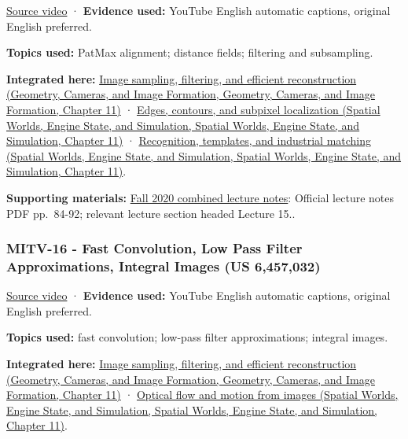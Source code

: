 \href{https://www.youtube.com/watch?v=R1yLwFOfwwc}{Source video} · \textbf{Evidence used:} YouTube English automatic captions, original English preferred.

\textbf{Topics used:} PatMax alignment; distance fields; filtering and subsampling.

\textbf{Integrated here:} \href{../03-Geometry-Cameras-and-Image-Formation/main.pdf\#nameddest=03-visual-computing-i-ch004-image-sampling-filtering-and-efficient-reconstruction}{Image sampling, filtering, and efficient reconstruction (Geometry, Cameras, and Image Formation, Geometry, Cameras, and Image Formation, Chapter 11)} · \href{../05-Spatial-Worlds-Engine-State-and-Simulation/main.pdf\#nameddest=04-visual-computing-ii-ch030-edges-contours-and-subpixel-localization}{Edges, contours, and subpixel localization (Spatial Worlds, Engine State, and Simulation, Spatial Worlds, Engine State, and Simulation, Chapter 11)} · \href{../05-Spatial-Worlds-Engine-State-and-Simulation/main.pdf\#nameddest=04-visual-computing-ii-ch030-recognition-templates-and-industrial-matching}{Recognition, templates, and industrial matching (Spatial Worlds, Engine State, and Simulation, Spatial Worlds, Engine State, and Simulation, Chapter 11)}.

\textbf{Supporting materials:} \href{https://ocw.mit.edu/courses/6-801-machine-vision-fall-2020/9ec44f69e72995c370b3797818ba01e6_MIT6_801F20_lectureNotes.pdf}{Fall 2020 combined lecture notes}: Official lecture notes PDF pp.~84-92; relevant lecture section headed Lecture 15..

\subsubsection{MITV-16 - Fast Convolution, Low Pass Filter Approximations, Integral Images (US 6,457,032)}\label{04-visual-computing-ii-ch036-mitv-16---fast-convolution-low-pass-filter-approximations-integral-images-us-6457032}

\href{https://www.youtube.com/watch?v=tblzZhYZtvU}{Source video} · \textbf{Evidence used:} YouTube English automatic captions, original English preferred.

\textbf{Topics used:} fast convolution; low-pass filter approximations; integral images.

\textbf{Integrated here:} \href{../03-Geometry-Cameras-and-Image-Formation/main.pdf\#nameddest=03-visual-computing-i-ch004-image-sampling-filtering-and-efficient-reconstruction}{Image sampling, filtering, and efficient reconstruction (Geometry, Cameras, and Image Formation, Geometry, Cameras, and Image Formation, Chapter 11)} · \href{../05-Spatial-Worlds-Engine-State-and-Simulation/main.pdf\#nameddest=04-visual-computing-ii-ch030-optical-flow-and-motion-from-images}{Optical flow and motion from images (Spatial Worlds, Engine State, and Simulation, Spatial Worlds, Engine State, and Simulation, Chapter 11)}.

